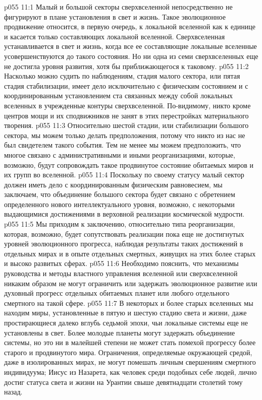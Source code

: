 \vs p055 11:1 Малый и большой секторы сверхвселенной непосредственно не фигурируют в плане установления в свет и жизнь. Такое эволюционное продвижение относится, в первую очередь, к локальной вселенной как к единице и касается только составляющих локальной вселенной. Сверхвселенная устанавливается в свет и жизнь, когда все ее составляющие локальные вселенные усовершенствуются до такого состояния. Но ни одна из семи сверхвселенных еще не достигла уровня развития, хотя бы приближающегося к таковому.
\vs p055 11:2 \pc {} Насколько можно судить по наблюдениям, стадия малого сектора, или пятая стадия стабилизации, имеет дело исключительно с физическим состоянием и с координированным установлением ста связанных между собой локальных вселенных в учрежденные контуры сверхвселенной. По\hyp{}видимому, никто кроме центров мощи и их сподвижников не занят в этих перестройках материального творения.
\vs p055 11:3 \pc {} Относительно шестой стадии, или стабилизации большого сектора, мы можем только делать предположения, потому что никто из нас не был свидетелем такого события. Тем не менее мы можем предположить, что многое связано с административными и иными реорганизациями, которые, возможно, будут сопровождать такое продвинутое состояние обитаемых миров и их групп во вселенной.
\vs p055 11:4 Поскольку по своему статусу малый сектор должен иметь дело с координированным физическим равновесием, мы заключаем, что объединение большого сектора будет связано с обретением определенного нового интеллектуального уровня, возможно, с некоторыми выдающимися достижениями в верховной реализации космической мудрости.
\vs p055 11:5 \pc Мы приходим к заключению, относительно типа реорганизации, которая, возможно, будет сопутствовать реализации пока еще не достигнутых уровней эволюционного прогресса, наблюдая результаты таких достижений в отдельных мирах и в опыте отдельных смертных, живущих на этих более старых и высоко развитых сферах.
\vs p055 11:6 Необходимо пояснить, что механизмы руководства и методы властного управления вселенной или сверхвселенной никаким образом не могут ограничить или задержать эволюционное развитие или духовный прогресс отдельных обитаемых планет или любого отдельного смертного на такой сфере.
\vs p055 11:7 В некоторых и более старых вселенных мы находим миры, установленные в пятую и шестую стадию света и жизни, даже простирающиеся далеко вглубь седьмой эпохи, чьи локальные системы еще не установлены в свет. Более молодые планеты могут задержать объединение системы, но это ни в малейшей степени не может стать помехой прогрессу более старого и продвинутого мира. Ограничения, определяемые окружающей средой, даже в изолированных мирах, не могут помешать личным свершениям смертного индивидуума; Иисус из Назарета, как человек среди подобных себе людей, лично достиг статуса света и жизни на Урантии свыше девятнадцати столетий тому назад.
